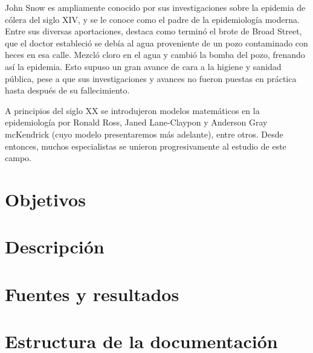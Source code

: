 John Snow es ampliamente conocido por sus investigaciones sobre la epidemia de cólera del siglo XIV, y se le conoce como el padre de la epidemiología moderna. Entre sus diversas aportaciones, destaca como terminó el brote de Broad Street, que el doctor estableció se debía al agua proveniente de un pozo contaminado con heces en esa calle. Mezcló cloro en el agua y cambió la bomba del pozo, frenando así la epidemia. Esto supuso un gran avance de cara a la higiene y sanidad pública, pese a que sus investigaciones y avances no fueron puestas en práctica hasta después de su fallecimiento.

A principios del siglo XX se introdujeron modelos matemáticos en la epidemiología por Ronald Ross, Janed Lane-Claypon y Anderson Gray mcKendrick (cuyo modelo presentaremos más adelante), entre otros. Desde entonces, muchos especialistas se unieron progresivamente al estudio de este campo.


\section{Objetivos}

\section{Descripción}

\section{Fuentes y resultados}

\section{Estructura de la documentación}



